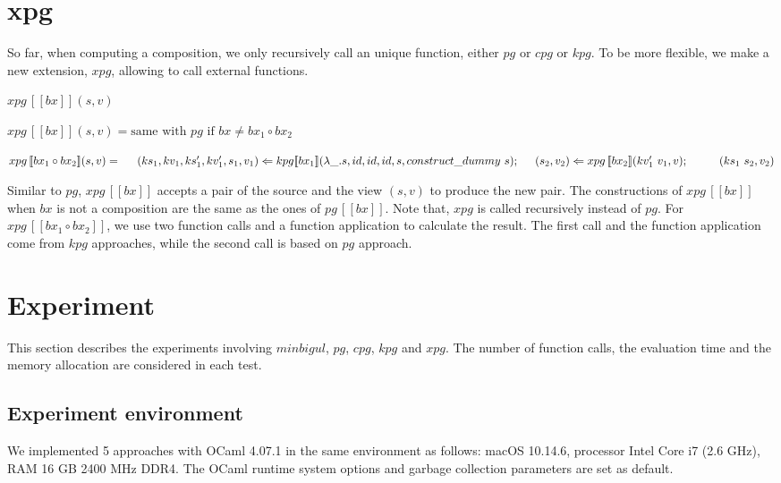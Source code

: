 \documentclass[runningheads]{llncs}
\newcommand{\tab}{\hspace*{5mm}}
\newcommand{\qtab}{\hspace*{5mm} \ \quad}
\newcommand{\pginline}[1]{pg \, [\![#1]\!]}
\newcommand{\kpg}[7]{kpg [\![#1]\!] (#2, #3, #4, #5, #6, #7)}
\newcommand{\xpg}[3]{xpg \, [\![#1]\!] (#2, #3)}
\newcommand{\xpginline}[1]{xpg \, [\![#1]\!]}
\begin{document}
\section{xpg}

So far, when computing a composition, we only recursively call an unique function, either $pg$ or $cpg$ or $kpg$. To be more flexible, we make a new extension, $xpg$, allowing to call external functions.

\begin{definition}
$\xpg{bx}{s}{v}$

$\xpg{bx}{s}{v} = \text{same with } pg \text{ if } bx \neq bx_1 \circ bx_2$

$\xpg{bx_1 \circ bx_2}{s}{v} =\\
    \tab (ks_1,kv_1, ks_1', kv_1', s_1, v_1) \Leftarrow \kpg{bx_1}{\lambda \_.s}{id}{id}{id}{s}{construct\_dummy \ s};\\
    \tab (s_2, v_2) \Leftarrow \xpg{bx_2}{kv_1' \ v_1}{v};\\
    \qtab (ks_1 \ s_2, v_2)$
\end{definition}

Similar to $pg$, $\xpginline{bx}$ accepts a pair of the source and the view $(s,v)$ to produce the new pair. The constructions of $\xpginline{bx}$ when $bx$ is not a composition are the same as the ones of $\pginline{bx}$. Note that, $xpg$ is called recursively instead of $pg$. For $\xpginline{bx_1 \circ bx_2}$, we use two function calls and a function application to calculate the result. The first call and the function application come from $kpg$ approaches, while the second call is based on $pg$ approach.

\section{Experiment}

This section describes the experiments involving $minbigul$, $pg$, $cpg$, $kpg$ and $xpg$. The number of function calls, the evaluation time and the memory allocation are considered in each test.

\subsection{Experiment environment}
We implemented 5 approaches with OCaml 4.07.1 in the same environment as follows: macOS 10.14.6, processor Intel Core i7 (2.6 GHz), RAM 16 GB 2400 MHz DDR4. The OCaml runtime system options and garbage collection parameters are set as default.  
\end{document}
